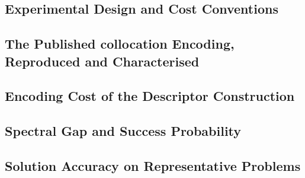%

\subsection{Experimental Design and Cost Conventions}

\subsection{The Published collocation Encoding, Reproduced and Characterised}

\subsection{Encoding Cost of the Descriptor Construction}

\subsection{Spectral Gap and Success Probability}

\subsection{Solution Accuracy on Representative Problems}

